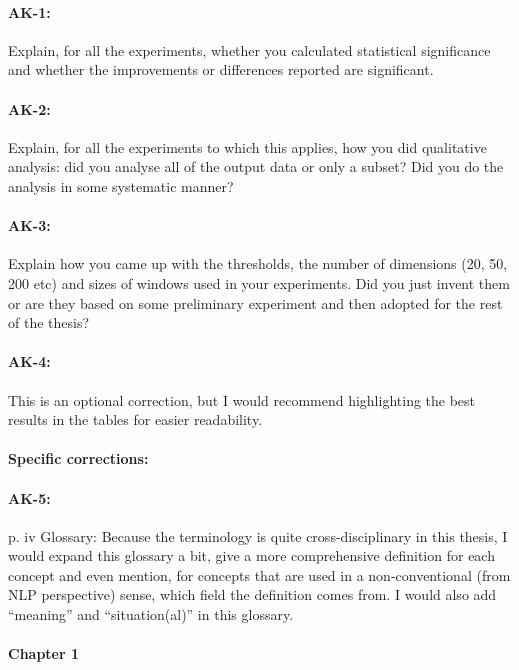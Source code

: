 \documentclass[11pt,a4paper]{article}
\begin{document}
\paragraph{AK-1:} Explain, for all the experiments, whether you calculated statistical significance and whether the improvements or differences reported are significant.

\paragraph{AK-2:} Explain, for all the experiments to which this applies, how you did qualitative analysis: did you analyse all of the output data or only a subset? Did you do the analysis in some systematic manner?

\paragraph{AK-3:} Explain how you came up with the thresholds, the number of dimensions (20, 50, 200 etc) and sizes of windows used in your experiments. Did you just invent them or are they based on some preliminary experiment and then adopted for the rest of the thesis?

\paragraph{AK-4:} This is an optional correction, but I would recommend highlighting the best results in the tables for easier readability.

\paragraph{Specific corrections:}

\paragraph{AK-5:} p. iv Glossary: Because the terminology is quite cross-disciplinary in this thesis, I would expand this glossary a bit, give a more comprehensive definition for each concept and even mention, for concepts that are used in a non-conventional (from NLP perspective) sense, which field the definition comes from. I would also add “meaning” and “situation(al)” in this glossary.

\paragraph{Chapter 1}
\end{document}

